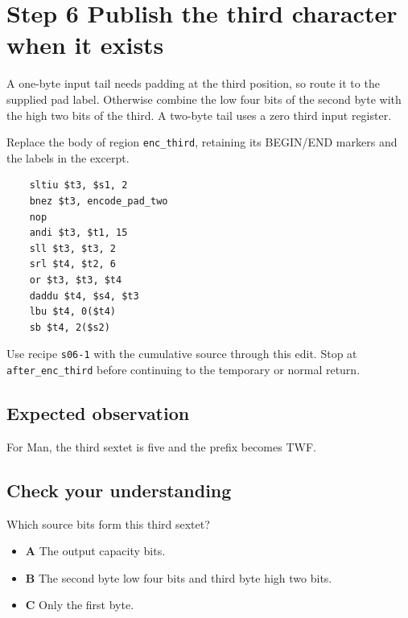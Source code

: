\section{Step 6 Publish the third character when it exists}\label{base64-s06}

A one-byte input tail needs padding at the third position, so route it to the supplied pad label. Otherwise combine the low four bits of the second byte with the high two bits of the third. A two-byte tail uses a zero third input register.

Replace the body of region \texttt{enc\_third}, retaining its BEGIN/END markers and the labels in the excerpt.

\begin{verbatim}
    sltiu $t3, $s1, 2
    bnez $t3, encode_pad_two
    nop
    andi $t3, $t1, 15
    sll $t3, $t3, 2
    srl $t4, $t2, 6
    or $t3, $t3, $t4
    daddu $t4, $s4, $t3
    lbu $t4, 0($t4)
    sb $t4, 2($s2)
\end{verbatim}

Use recipe \texttt{s06-1} with the cumulative source through this edit. Stop at \texttt{after\_enc\_third} before continuing to the temporary or normal return.

\subsection{Expected observation}
For Man, the third sextet is five and the prefix becomes TWF.

\subsection{Check your understanding}
Which source bits form this third sextet?

\begin{itemize}
  \item \textbf{A} The output capacity bits.
  \item \textbf{B} The second byte low four bits and third byte high two bits.
  \item \textbf{C} Only the first byte.
\end{itemize}
